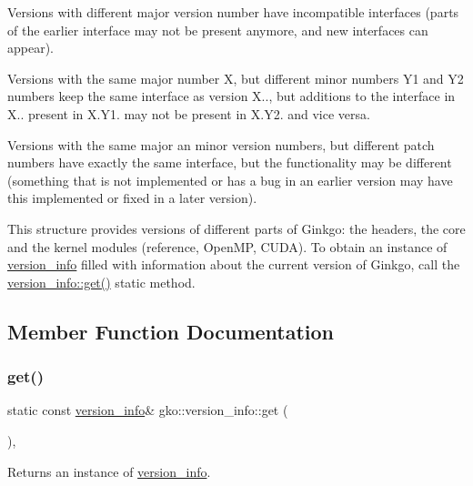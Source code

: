 \begin{DoxyEnumerate}
\item Versions with different major version number have incompatible interfaces (parts of the earlier interface may not be present anymore, and new interfaces can appear).
\item Versions with the same major number X, but different minor numbers Y1 and Y2 numbers keep the same interface as version X.., but additions to the interface in X.. present in X.\+Y1. may not be present in X.\+Y2. and vice versa.
\item Versions with the same major an minor version numbers, but different patch numbers have exactly the same interface, but the functionality may be different (something that is not implemented or has a bug in an earlier version may have this implemented or fixed in a later version).
\end{DoxyEnumerate}

This structure provides versions of different parts of Ginkgo\+: the headers, the core and the kernel modules (reference, Open\+MP, C\+U\+DA). To obtain an instance of \hyperlink{classgko_1_1version__info}{version\+\_\+info} filled with information about the current version of Ginkgo, call the \hyperlink{classgko_1_1version__info_a6daeb8a087cfb57fa055526fc133d8eb}{version\+\_\+info\+::get()} static method. 

\subsection{Member Function Documentation}
\mbox{\label{classgko_1_1version__info_a6daeb8a087cfb57fa055526fc133d8eb}} 
\subsubsection{\texorpdfstring{get()}{get()}}
{\footnotesize\ttfamily static const \hyperlink{classgko_1_1version__info}{version\+\_\+info}\& gko\+::version\+\_\+info\+::get (\begin{DoxyParamCaption}{ }\end{DoxyParamCaption})\hspace{0.3cm}{\ttfamily [inline]}, {\ttfamily [static]}}



Returns an instance of \hyperlink{classgko_1_1version__info}{version\+\_\+info}. 

